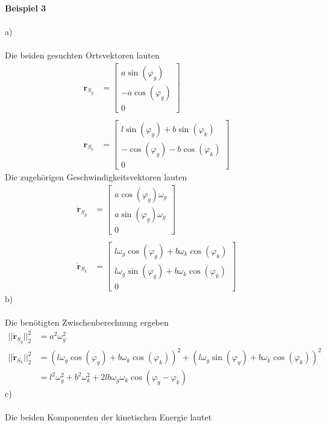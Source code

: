 \newpage
\noindent
\textbf{Beispiel 3}\\ \\
a)\\ \\
Die beiden gesuchten Ortsvektoren lauten
\begin{align*}
	\textbf{r}_{S_g} &= \begin{bmatrix}
		a\sin(\varphi_g) \\
		-a\cos(\varphi_g) \\
		0					
	\end{bmatrix}
	\\ \\
	\textbf{r}_{S_k} &= \begin{bmatrix}
		l\sin(\varphi_g) + b\sin(\varphi_k) \\
		-\cos(\varphi_g) - b\cos(\varphi_k) \\
		0
	\end{bmatrix}
\end{align*}
Die zugehörigen Geschwindigkeitsvektoren lauten
\begin{align*}
	\dot{\textbf{r}}_{S_g} &= \begin{bmatrix}
		a\cos(\varphi_g)\omega_g \\
		a\sin(\varphi_g)\omega_g \\
		0
	\end{bmatrix}
	\\ \\
	\dot{\textbf{r}}_{S_k} &= \begin{bmatrix}
		l\omega_g\cos(\varphi_g) + b\omega_k\cos(\varphi_k) \\
		l\omega_g\sin(\varphi_g) + b\omega_k\cos(\varphi_k) \\
		0
	\end{bmatrix}
\end{align*}
b)\\ \\
Die benötigten Zwischenberechnung ergeben
\begin{align*}
	||\dot{\textbf{r}}_{S_g}||_2^2 &= a^2\omega^2_g \\
	||\dot{\textbf{r}}_{S_k}||_2^2 &= (l\omega_g\cos(\varphi_g) + b\omega_k\cos(\varphi_k))^2 + (l\omega_g\sin(\varphi_g) + b\omega_k\cos(\varphi_k))^2 \\
	&= l^2\omega^2_g + b^2\omega^2_k  + 2lb\omega_g\omega_k\cos(\varphi_g - \varphi_k)
\end{align*}
c)\\ \\
Die beiden Komponenten der kinetischen Energie lautet
